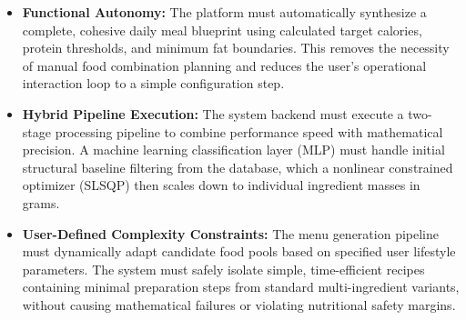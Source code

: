 \begin{itemize}
    \item \textbf{Functional Autonomy:} The platform must automatically synthesize 
    a complete, cohesive daily meal blueprint using calculated target calories, 
    protein thresholds, and minimum fat boundaries. This removes the necessity of 
    manual food combination planning and reduces the user's operational interaction 
    loop to a simple configuration step.
    \item \textbf{Hybrid Pipeline Execution:} The system backend must execute a two-stage 
    processing pipeline to combine performance speed with mathematical precision. 
    A machine learning classification layer (MLP) must handle initial structural baseline
    filtering from the database, which a nonlinear constrained optimizer (SLSQP)
    then scales down to individual ingredient masses in grams.
    \item \textbf{User-Defined Complexity Constraints:} The menu generation pipeline must 
    dynamically adapt candidate food pools based on specified user lifestyle parameters. 
    The system must safely isolate simple, time-efficient recipes containing minimal 
    preparation steps from standard multi-ingredient variants, without causing mathematical 
    failures or violating nutritional safety margins.
\end{itemize}